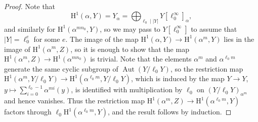 \documentclass[reqno]{amsart}
\numberwithin{equation}{subsection}
\DeclareMathOperator{\Aut}{Aut}
\newcommand{\rH}{\ensuremath{\mathrm{H}}\xspace}
\theoremstyle{remark}
\numberwithin{equation}{subsection}
\numberwithin{figure}{subsection}
\begin{document}
\begin{proof}
Note that
\[
\rH^1(\alpha, Y) = Y_\alpha = \bigoplus_{\ell_0 \mid |Y|} Y[\ell_0^\infty]_\alpha,
\]
and similarly for $\rH^1(\alpha^{mn_0}, Y)$, so we may pass to $Y[\ell_0^\infty]$ to assume that $|Y| = \ell_0^e$ for some $e$. The image of the map $\rH^1(\alpha, Y) \to \rH^1(\alpha^m, Y)$ lies in the image of $\rH^1(\alpha^m, Z)$, so it is enough to show that the map $\rH^1(\alpha^m, Z) \to \rH^1(\alpha^{mn_0})$ is trivial. Note that the elements $\alpha^m$ and $\alpha^{\ell_0 m}$ generate the same cyclic subgroup of $\Aut(Y/\ell_0 Y)$, so the restriction map $\rH^1(\alpha^m, Y/\ell_0 Y) \to \rH^1(\alpha^{\ell_0 m}, Y/\ell_0 Y)$, which is induced by the map $Y \to Y$, $y \mapsto \sum_{i=0}^{\ell_0-1} \alpha^{mi}(y)$, is identified with multiplication by $\ell_0$ on $(Y/\ell_0 Y)_{\alpha^m}$ and hence vanishes. Thus the restriction map $\rH^1(\alpha^m, Z) \to \rH^1(\alpha^{\ell_0 m}, Y)$ factors through $\ell_0 \rH^1(\alpha^{\ell_0 m}, Y)$, and the result follows by induction.
\end{proof}
\end{document}
